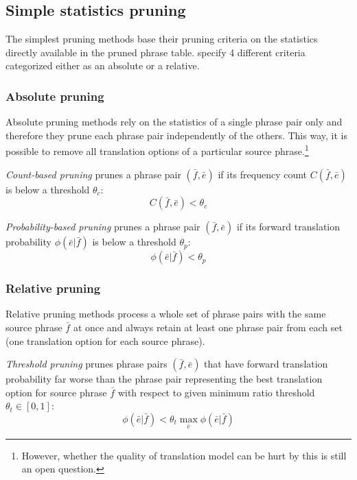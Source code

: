 \subsection{Simple statistics pruning}
\label{sec:simple-statistics-pruning}

The simplest pruning methods base their pruning criteria on the statistics directly
available in the pruned phrase table. \citet{zens:systcomp} specify 4 different criteria
categorized either as an absolute or a relative.

\subsubsection*{Absolute pruning}

Absolute pruning methods rely on the statistics of a single phrase pair only and therefore
they prune each phrase pair independently of the others.
This way, it is possible to remove all translation options of a particular source
phrase.\footnote{However, whether the quality of translation model can be hurt by this is
still an open question.}

\emph{Count-based pruning} prunes a phrase pair $(\bar{f},\bar{e})$ if its frequency count
$C(\bar{f},\bar{e})$ is below a threshold $\theta_{c}$:
\begin{equation} \label{eq:count-based-pruning}
  C(\bar{f},\bar{e}) < \theta_{c}
\end{equation}

\emph{Probability-based pruning} prunes a phrase pair $(\bar{f},\bar{e})$ if its forward
translation probability $\phi(\bar{e}|\bar{f})$ is below a threshold $\theta_{p}$:
\begin{equation}
  \phi(\bar{e}|\bar{f}) < \theta_{p}
\end{equation}

\subsubsection*{Relative pruning}

Relative pruning methods process a whole set of phrase pairs with the same source phrase
$\bar{f}$ at once and always retain at least one phrase pair from each set (one translation
option for each source phrase).

\emph{Threshold pruning} prunes phrase pairs $(\bar{f},\bar{e})$ that have forward translation
probability far worse than the phrase pair representing the best translation option for source
phrase $\bar{f}$ with respect to given minimum ratio threshold $\theta_{t} \in [0,1]$:
\begin{equation}
  \phi(\bar{e}|\bar{f}) < \theta_{t} \max_{\bar{e}}{\phi(\bar{e}|\bar{f})}
\end{equation}

